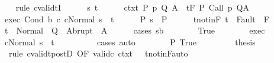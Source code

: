 \begin{isabellebody}
\ \ \isamarkupfalse%
\ {\isacharparenleft}rule\ cvalidtI{\isacharparenright}\isanewline
\ \ \ \ \isamarkupfalse%
\ s\ t\isanewline
\ \ \ \ \isamarkupfalse%
\ ctxt{\isacharcolon}\ {\isachardoublequoteopen}{\isasymforall}{\isacharparenleft}P{\isacharcomma}\ p{\isacharcomma}\ Q{\isacharcomma}\ A{\isacharparenright}{\isasymin}{\isasymTheta}{\isachardot}\ {\isasymGamma}\ {\isasymTurnstile}\isactrlsub t\isactrlbsub {\isacharslash}F\isactrlesub \ P\ {\isacharparenleft}Call\ p{\isacharparenright}\ Q{\isacharcomma}A{\isachardoublequoteclose}\isanewline
\ \ \ \ \isamarkupfalse%
\ exec{\isacharcolon}\ {\isachardoublequoteopen}{\isasymGamma}{\isasymturnstile}{\isasymlangle}Cond\ b\ c{}\ c{}{\isacharcomma}Normal\ s{\isasymrangle}\ {\isasymRightarrow}\ t{\isachardoublequoteclose}\isanewline
\ \ \ \ \isamarkupfalse%
\ P{\isacharcolon}\ {\isachardoublequoteopen}s\ {\isasymin}\ P{\isachardoublequoteclose}\isanewline
\ \ \ \ \isamarkupfalse%
\ t{\isacharunderscore}notin{\isacharunderscore}F{\isacharcolon}\ {\isachardoublequoteopen}t\ {\isasymnotin}\ Fault\ {\isacharbackquote}\ F{\isachardoublequoteclose}\isanewline
\ \ \ \ \isamarkupfalse%
\ {\isachardoublequoteopen}t\ {\isasymin}\ Normal\ {\isacharbackquote}\ Q\ {\isasymunion}\ Abrupt\ {\isacharbackquote}\ A{\isachardoublequoteclose}\isanewline
\ \ \ \ \isamarkupfalse%
\ {\isacharparenleft}cases\ {\isachardoublequoteopen}s{\isasymin}b{\isachardoublequoteclose}{\isacharparenright}\isanewline
\ \ \ \ \ \ \isamarkupfalse%
\ True\isanewline
\ \ \ \ \ \ \isamarkupfalse%
\ exec\ \isamarkupfalse%
\ {\isachardoublequoteopen}{\isasymGamma}{\isasymturnstile}{\isasymlangle}c{}{\isacharcomma}Normal\ s{\isasymrangle}\ {\isasymRightarrow}\ t{\isachardoublequoteclose}\isanewline
\ \ \ \ \ \ \ \ \isamarkupfalse%
\ cases\ auto\isanewline
\ \ \ \ \ \ \isamarkupfalse%
\ P\ True\ \isanewline
\ \ \ \ \ \ \isamarkupfalse%
\ {\isacharquery}thesis\isanewline
\ \ \ \ \ \ \ \ \isamarkupfalse%
\ {\isacharminus}\ {\isacharparenleft}rule\ cvalidt{\isacharunderscore}postD\ {\isacharbrackleft}OF\ valid{\isacharunderscore}c{}\ ctxt\ {\isacharunderscore}\ {\isacharunderscore}\ t{\isacharunderscore}notin{\isacharunderscore}F{\isacharbrackright}{\isacharcomma}auto{\isacharparenright}\isanewline
\ \ \ \ \isamarkupfalse%
\isanewline
\ \ \ \ \ \ \isamarkupfalse%

\end{isabellebody}
